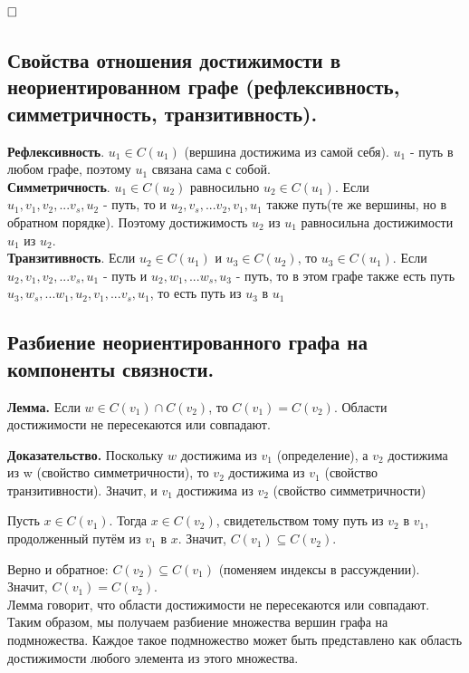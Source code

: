 \documentclass[a4paper, 10pt]{article}
\begin{document}
$\hfill \square$


\subsection{Свойства отношения достижимости в неориентированном графе (рефлексивность, симметричность, транзитивность).}

\textbf{Рефлексивность}. $u_1 \in C(u_1)$ (вершина достижима из самой себя). $u_1$ - путь в любом графе, поэтому $u_1$ связана сама с собой. \\

\textbf{Симметричность}. $u_1 \in C(u_2)$ равносильно $u_2 \in C(u_1)$. Если $u_1, v_1, v_2, ... v_s, u_2$ - путь, то и $u_2, v_s, ... v_2, v_1, u_1$ также путь(те же вершины, но в обратном порядке). Поэтому достижимость $u_2$ из $u_1$ равносильна достижимости $u_1$ из $u_2$. \\

\textbf{Транзитивность}. Если $u_2 \in C(u_1)$ и $u_3 \in C(u_2)$, то $u_3 \in C(u_1)$. Если $u_2, v_1, v_2, ... v_s, u_1$ - путь и $u_2, w_1, ... w_s, u_3$ - путь, то в этом графе также есть путь $u_3, w_s, ... w_1, u_2, v_1, ... v_s, u_1$, то есть путь из $u_3$ в $u_1$


\subsection{Разбиение неориентированного графа на компоненты связности.}

\textbf{Лемма.} Если $w \in C(v_1) \cap C(v_2)$, то $C(v_1) = C(v_2)$. Области достижимости не пересекаются или совпадают.

\medskip

\textbf{Доказательство.} Поскольку $w$ достижима из $v_1$ (определение), а $v_2$ достижима из w (свойство симметричности), то $v_2$ достижима из $v_1$ (свойство транзитивности). Значит, и $v_1$ достижима из $v_2$ (свойство симметричности)


Пусть $x \in C(v_1)$. Тогда $x \in C(v_2)$, свидетельством тому путь из $v_2$ в $v_1$, продолженный путём из $v_1$ в $x$. Значит, $C(v_1) \subseteq C(v_2)$.

Верно и обратное: $C(v_2) \subseteq C(v_1)$ (поменяем индексы в рассуждении). Значит, $C(v_1) = C(v_2)$. \\



Лемма говорит, что области достижимости не пересекаются или совпадают. Таким образом, мы получаем разбиение множества вершин графа на подмножества. Каждое такое подмножество может быть представлено как область достижимости любого элемента из этого множества.
\end{document}
